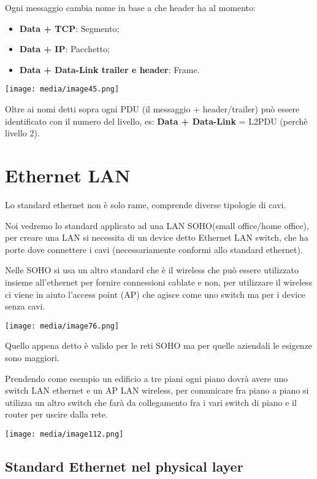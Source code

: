 Ogni messaggio cambia nome in base a che header ha al momento:

\begin{itemize}
\item
  \textbf{Data + TCP}: Segmento;
\item
  \textbf{Data + IP}: Pacchetto;
\item
  \textbf{Data + Data-Link trailer e header}: Frame.
\end{itemize}

\texttt{[image: media/image45.png]}

Oltre ai nomi detti sopra ogni PDU (il messaggio + header/trailer) può
essere identificato con il numero del livello, es: \textbf{Data +
Data-Link} = L2PDU (perchè livello 2).

\section{Ethernet LAN}\label{ethernet-lan}

Lo standard ethernet non è solo rame, comprende diverse tipologie di
cavi.

Noi vedremo lo standard applicato ad una LAN SOHO(small office/home
office), per creare una LAN si necessita di un device detto Ethernet LAN
switch, che ha porte dove connettere i cavi (necessariamente conformi
allo standard ethernet).

Nelle SOHO si usa un altro standard che è il wireless che può essere
utilizzato insieme all'ethernet per fornire connessioni cablate e non,
per utilizzare il wireless ci viene in aiuto l'access point (AP) che
agisce come uno switch ma per i device senza cavi.

\texttt{[image: media/image76.png]}

Quello appena detto è valido per le reti SOHO ma per quelle aziendali le
esigenze sono maggiori.

Prendendo come esempio un edificio a tre piani ogni piano dovrà avere
uno switch LAN ethernet e un AP LAN wireless, per comunicare fra piano a
piano si utilizza un altro switch che farà da collegamento fra i vari
switch di piano e il router per uscire dalla rete.

\texttt{[image: media/image112.png]}

\subsection{Standard Ethernet nel physical
layer}\label{standard-ethernet-nel-physical-layer}

